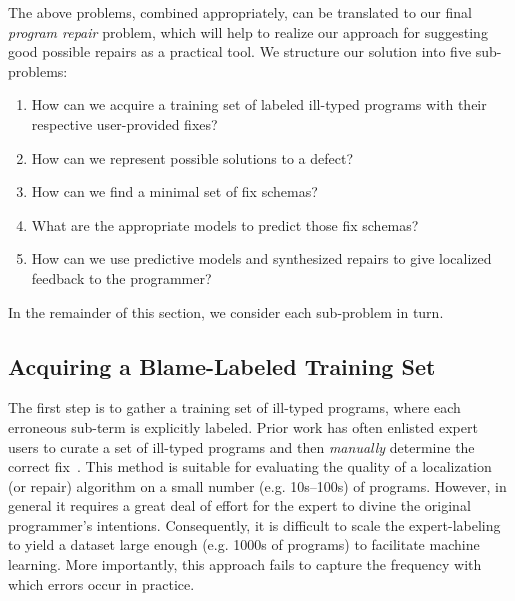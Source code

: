The above problems, combined appropriately, can be translated to our final
\emph{program repair} problem, which will help to realize our approach for
suggesting good possible repairs as a practical tool. We structure our solution
into five sub-problems:
\begin{enumerate}
  \item How can we acquire a training set of labeled ill-typed programs with
  their respective user-provided fixes?
  \item How can we represent possible solutions to a defect?
  \item How can we find a minimal set of fix schemas?
  \item What are the appropriate models to predict those fix schemas?
  \item How can we use predictive models and synthesized repairs to give
  localized feedback to the programmer?
\end{enumerate}

In the remainder of this section, we consider each sub-problem in turn.



\subsection{Acquiring a Blame-Labeled Training Set}
\label{subsec:step1}

The first step is to gather a training set of ill-typed programs, where each
erroneous sub-term is explicitly labeled. Prior work has often enlisted expert
users to curate a set of ill-typed programs and then \emph{manually} determine
the correct fix~\citep[\eg][]{Lerner2007-dt, Loncaric2016-uk}. This method is
suitable for evaluating the quality of a localization (or repair) algorithm on a
small number (e.g. 10s--100s) of programs. However, in general it requires a
great deal of effort for the expert to divine the original programmer's
intentions. Consequently, it is difficult to scale the expert-labeling to yield
a dataset large enough (e.g. 1000s of programs) to facilitate machine learning.
More importantly, this approach fails to capture the frequency with which errors
occur in practice.

